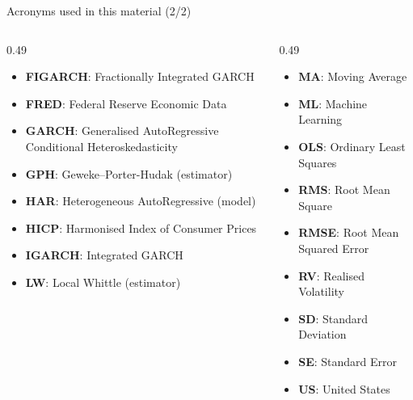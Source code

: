 \begin{frame}{Acronyms used in this material (2/2)}
\begin{columns}[T]
\begin{column}{0.49\textwidth}
\begin{itemize}\setlength{\itemsep}{0pt}
    \item \textbf{FIGARCH}: Fractionally Integrated GARCH
    \item \textbf{FRED}: Federal Reserve Economic Data
    \item \textbf{GARCH}: Generalised AutoRegressive Conditional Heteroskedasticity
    \item \textbf{GPH}: Geweke–Porter-Hudak (estimator)
    \item \textbf{HAR}: Heterogeneous AutoRegressive (model)
    \item \textbf{HICP}: Harmonised Index of Consumer Prices
    \item \textbf{IGARCH}: Integrated GARCH
    \item \textbf{LW}: Local Whittle (estimator)
\end{itemize}
\end{column}
\begin{column}{0.49\textwidth}
\begin{itemize}\setlength{\itemsep}{0pt}
    \item \textbf{MA}: Moving Average
    \item \textbf{ML}: Machine Learning
    \item \textbf{OLS}: Ordinary Least Squares
    \item \textbf{RMS}: Root Mean Square
    \item \textbf{RMSE}: Root Mean Squared Error
    \item \textbf{RV}: Realised Volatility
    \item \textbf{SD}: Standard Deviation
    \item \textbf{SE}: Standard Error
    \item \textbf{US}: United States
\end{itemize}
\end{column}
\end{columns}
\end{frame}

